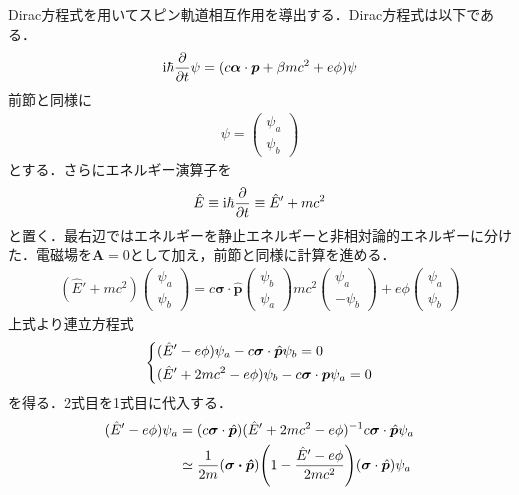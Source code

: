\documentclass{report}
\begin{document}
  Dirac方程式を用いてスピン軌道相互作用を導出する．Dirac方程式は以下である．
  \begin{align}
    \mathrm{i}\hbar\frac{\partial}{\partial t}\psi = (c\bm{\alpha} \cdot \bm{p} + \beta mc^2 + e\phi) \psi
  \end{align}
  前節と同様に
  \begin{align}
    \psi=
    \begin{pmatrix}
      \psi_a\\
      \psi_b
    \end{pmatrix}
  \end{align}
  とする．さらにエネルギー演算子を
  \begin{align}
    \hat{E} \equiv \mathrm{i}\hbar\frac{\partial}{\partial t} \equiv \hat{E}' + mc^2
  \end{align}
  と置く．最右辺ではエネルギーを静止エネルギーと非相対論的エネルギーに分けた．電磁場を$\bm{A} =0$として加え，前節と同様に計算を進める．
  \begin{align}
    (\hat{E}' + mc^2) 
    \begin{pmatrix}
      \psi_a\\
      \psi_b
    \end{pmatrix}
    = c\bm{\sigma}\cdot \hat{\bm{p}}
    \begin{pmatrix}
      \psi_b\\
      \psi_a
    \end{pmatrix}
    mc^2
    \begin{pmatrix}
      \psi_a\\
      -\psi_b
    \end{pmatrix}
    + e\phi
    \begin{pmatrix}
      \psi_a\\
      \psi_b
    \end{pmatrix}
  \end{align}
  上式より連立方程式
  \begin{align}
    \begin{dcases}
      (\hat{E}' - e\phi) \psi_a - c\bm{\sigma}\cdot\hat{\bm{p}} \psi_b=0\\
      (\hat{E}' + 2mc^2 - e\phi) \psi_b - c \bm{\sigma}\cdot\bm{p}\psi_a = 0
    \end{dcases}
  \end{align}
  を得る．2式目を1式目に代入する．
  \begin{align}
    (\hat{E}' - e\phi) \psi_a &= (c\bm{\sigma}\cdot\hat{\bm{p}})(\hat{E}' + 2mc^2 - e\phi)^{-1}c\bm{\sigma}\cdot\hat{\bm{p}}\psi_a\\
    &\simeq \frac{1}{2m}(\bm{\sigma\cdot\hat{\bm{p}}})\qty(1 - \frac{\hat{E}' - e\phi}{2mc^2})(\bm{\sigma}\cdot\hat{\bm{p}})\psi_a\\
  \end{align}
\end{document}
